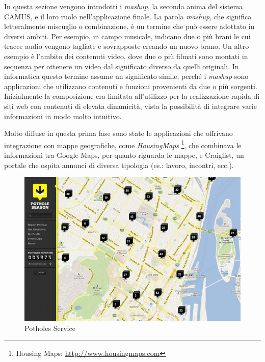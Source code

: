 In questa sezione vengono introdotti i \emph{mashup}, la seconda anima del sistema CAMUS, e il loro ruolo nell'applicazione finale.
La parola \emph{mashup}, che significa letteralmente miscuglio o combinazione, è un termine che può essere adottato in diversi ambiti.
Per esempio, in campo musicale, indicano due o più brani le cui tracce audio vengono tagliate e sovrapposte creando un nuovo brano. Un altro esempio è l'ambito dei contenuti video, dove due o più filmati sono montati in sequenza per ottenere un video dal significato diverso da quelli originali.
In informatica questo termine assume un significato simile, perché i \emph{mashup} sono applicazioni che utilizzano contenuti e funzioni provenienti da due o più sorgenti\cite{DBLP:books/sp/DanielM14}.
Inizialmente la composizione era limitata all'utilizzo per la realizzazione rapida di siti web con contenuti di elevata dinamicità, vista la possibilità di integrare varie informazioni in modo molto intuitivo.

Molto diffuse in questa prima fase sono state le applicazioni che offrivano integrazione con mappe geografiche, come \emph{HousingMaps} \footnote{Housing Maps: \url{http://www.housingmaps.com}}, che combinava le informazioni tra Google Maps, per quanto riguarda le mappe, e Craiglist, un portale che ospita annunci di diversa tipologia (es.: lavoro, incontri, ecc.).

\begin{figure}[ht]
	\centering
	\includegraphics[width=\textwidth]{2-preliminari/Immagini/potholes_service.jpg}
	\caption{Potholes Service}\label{fig:potholes}
\end{figure}

